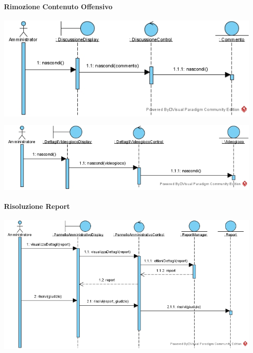 \newpage
\paragraph{Rimozione Contenuto Offensivo}
\begin{center}
\includegraphics[width=\textwidth,height=\textheight,keepaspectratio]{Figure/SequenceDiagrams/RimozioneContenutoOffensivo.jpg}
\end{center}

\begin{center}
\includegraphics[width=\textwidth,height=\textheight,keepaspectratio]{Figure/SequenceDiagrams/RimozioneContenutoOffensivoVideogioco.jpg}
\end{center}

\newpage
\paragraph{Risoluzione Report}
\begin{center}
\includegraphics[width=\textwidth,height=\textheight,keepaspectratio]{Figure/SequenceDiagrams/RisoluzioneReport.jpg}
\end{center}



